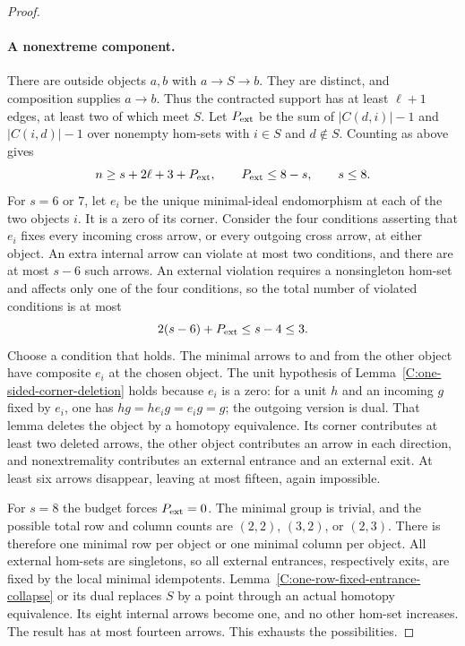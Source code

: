 \begin{proof}
\paragraph{A nonextreme component.}
There are outside objects $a,b$ with $a\to S\to b$.
They are distinct, and composition supplies $a\to b$.
Thus the contracted support has at least $\ell+1$ edges,
at least two of which meet $S$. Let $P_{\rm ext}$ be the sum
of $|C(d,i)|-1$ and $|C(i,d)|-1$ over nonempty hom-sets with
$i\in S$ and $d\notin S$. Counting as above gives
\[
 n\geq s+2\ell+3+P_{\rm ext},\qquad
 P_{\rm ext}\leq8-s,\qquad s\leq8.
\]
For $s=6$ or $7$, let $e_i$ be the unique minimal-ideal
endomorphism at each of the two objects $i$. It is a zero
of its corner. Consider the four conditions asserting that
$e_i$ fixes every incoming cross arrow, or every outgoing
cross arrow, at either object. An extra internal arrow can
violate at most two conditions, and there are at most $s-6$
such arrows. An external violation requires a nonsingleton
hom-set and affects only one of the four conditions, so
the total number of violated conditions is at most
\[
 2(s-6)+P_{\rm ext}\leq s-4\leq3.
\]
Choose a condition that holds. The minimal arrows to and from
the other object have composite $e_i$ at the chosen object.
The unit hypothesis of Lemma~\ref{C:one-sided-corner-deletion}
holds because $e_i$ is a zero: for a unit $h$ and an incoming
$g$ fixed by $e_i$, one has $hg=he_i g=e_i g=g$; the outgoing
version is dual. That lemma deletes the object by a homotopy
equivalence. Its corner contributes at least two deleted
arrows, the other object contributes an arrow in each direction,
and nonextremality contributes an external entrance and an
external exit. At least six arrows disappear, leaving at most
fifteen, again impossible.

For $s=8$ the budget forces $P_{\rm ext}=0$.
The minimal group is trivial, and the possible total row and
column counts are $(2,2)$, $(3,2)$, or $(2,3)$.
There is therefore one minimal row per object or one minimal
column per object. All external hom-sets are singletons, so
all external entrances, respectively exits, are fixed by the
local minimal idempotents. Lemma~\ref{C:one-row-fixed-entrance-collapse}
or its dual replaces $S$ by a point through an actual
homotopy equivalence. Its eight internal arrows become one,
and no other hom-set increases. The result has at most
fourteen arrows. This exhausts the possibilities.
\end{proof}

